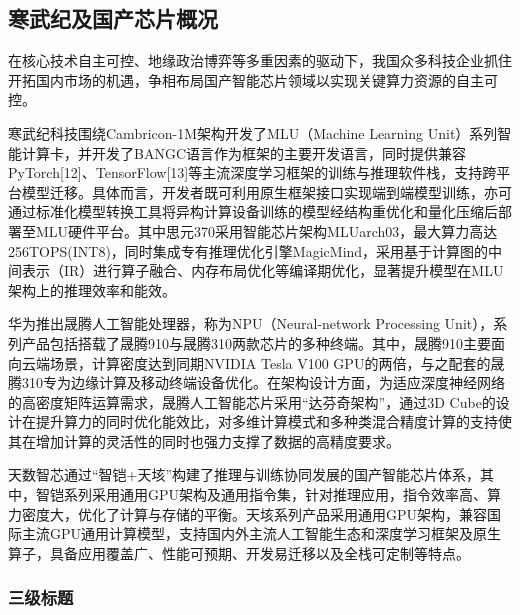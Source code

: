 \documentclass[a4paper, nosysfonts]{hpcchina}
\begin{document}
    \subsection{寒武纪及国产芯片概况}
    在核心技术自主可控、地缘政治博弈等多重因素的驱动下，我国众多科技企业抓住开拓国内市场的机遇，争相布局国产智能芯片领域以实现关键算力资源的自主可控。

    寒武纪科技围绕Cambricon-1M架构开发了MLU（Machine Learning Unit）系列智能计算卡，并开发了BANGC语言作为框架的主要开发语言，同时提供兼容PyTorch[12]、TensorFlow[13]等主流深度学习框架的训练与推理软件栈，支持跨平台模型迁移。具体而言，开发者既可利用原生框架接口实现端到端模型训练，亦可通过标准化模型转换工具将异构计算设备训练的模型经结构重优化和量化压缩后部署至MLU硬件平台。其中思元370采用智能芯片架构MLUarch03，最大算力高达256TOPS(INT8)，同时集成专有推理优化引擎MagicMind，采用基于计算图的中间表示（IR）进行算子融合、内存布局优化等编译期优化，显著提升模型在MLU架构上的推理效率和能效。

    华为推出晟腾人工智能处理器，称为NPU（Neural-network Processing Unit），系列产品包括搭载了晟腾910与晟腾310两款芯片的多种终端。其中，晟腾910主要面向云端场景，计算密度达到同期NVIDIA Tesla V100 GPU的两倍，与之配套的晟腾310专为边缘计算及移动终端设备优化。在架构设计方面，为适应深度神经网络的高密度矩阵运算需求，晟腾人工智能芯片采用“达芬奇架构”，通过3D Cube的设计在提升算力的同时优化能效比，对多维计算模式和多种类混合精度计算的支持使其在增加计算的灵活性的同时也强力支撑了数据的高精度要求。

    天数智芯通过“智铠+天垓”构建了推理与训练协同发展的国产智能芯片体系，其中，智铠系列采用通用GPU架构及通用指令集，针对推理应用，指令效率高、算力密度大，优化了计算与存储的平衡。天垓系列产品采用通用GPU架构，兼容国际主流GPU通用计算模型，支持国内外主流人工智能生态和深度学习框架及原生算子，具备应用覆盖广、性能可预期、开发易迁移以及全栈可定制等特点。


    \subsubsection{三级标题}
    \zhlipsum[10]
\end{document}
